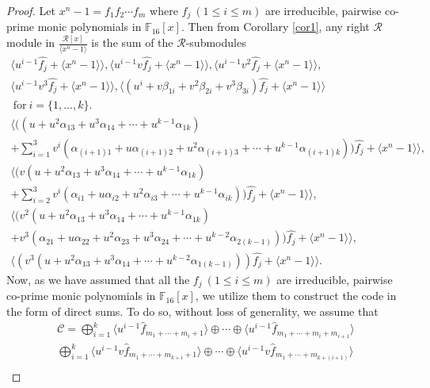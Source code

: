 \documentclass{amsart}
\theoremstyle{definition}
\theoremstyle{remark}
\numberwithin{equation}{section}
\begin{document}
 \begin{proof}
       Let $x^n-1=f_1f_2\cdots f_m$ where $f_j~(1\leq i\leq m)$ are irreducible, pairwise co-prime monic polynomials in $\mathbb F_{16}[x]$. Then from Corollary \ref{cor1}, any right $\mathcal{R}$ module in $\frac{\mathcal{R}[x]}{\langle x^n-1\rangle}$ is the sum of the $\mathcal{R}$-submodules \allowdisplaybreaks\begin{gather*}\langle u^{i-1}\hat{f_j} + \langle x^n-1\rangle \rangle ,
         \langle u^{i-1}v\hat{f_j} + \langle x^n-1\rangle \rangle ,  \langle u^{i-1}v^2\hat{f_j} + \langle x^n-1\rangle \rangle , \\  \langle u^{i-1}v^3\hat{f_j} + \langle x^n-1\rangle \rangle ,
        \langle (u^i+ v\beta_{1i} + v^2\beta_{2i} + v^3\beta_{3i})\hat{f_j} + \langle x^n-1\rangle \rangle \\ ~\text{for}~ i = \{1,\dots,k\}.\\
        \langle ((u + u^2\alpha_{13} + u^3\alpha_{14} + \cdots + u^{k-1}\alpha_{1k}) \\+ \sum_{i=1}^{3} v^i( \alpha_{(i+1)1} + u\alpha_{(i+1)2} + u^2\alpha_{(i+1)3} + \cdots + u^{k-1}\alpha_{(i+1)k} ))\hat{f_j} + \langle x^n-1\rangle \rangle ,\\
        \langle (v(u + u^2\alpha_{13} + u^3\alpha_{14} + \cdots + u^{k-1}\alpha_{1k}) \\ +\sum_{i=2}^{3} v^i( \alpha_{i1} + u\alpha_{i2} + u^2\alpha_{i3}  + \cdots + u^{k-1}\alpha_{ik} ))\hat{f_j} + \langle x^n-1\rangle \rangle, \\  \langle (v^2(u + u^2\alpha_{13} + u^3\alpha_{14} + \cdots + u^{k-1}\alpha_{1k}) \\+ v^3( \alpha_{21} + u\alpha_{22} + u^2\alpha_{23} + u^3\alpha_{24} + \cdots + u^{k-2}\alpha_{2(k-1)}))\hat{f_j} + \langle x^n-1\rangle \rangle, \\ \langle (v^3(u + u^2\alpha_{13} + u^3\alpha_{14} + \cdots + u^{k-2}\alpha_{1(k-1)}))\hat{f_j} + \langle x^n-1\rangle \rangle.\end{gather*}
{Now, as we have assumed that all the $f_j~(1\leq i\leq m)$ are irreducible, pairwise co-prime monic polynomials in $\mathbb F_{16}[x]$, we utilize them to construct the code in the form of direct sums. To do so, without loss of generality, we assume that}
    \allowdisplaybreaks
      \begin{gather*}
		\mathcal{C}= \bigoplus_{i=1}^{k}\langle u^{i-1}\hat{f}_{m_1+ \cdots+m_i+1}\rangle \oplus\cdots\oplus \langle u^{i-1}\hat{f}_{m_1+\cdots+m_i+m_{i+1}}\rangle
  \\ \bigoplus_{i=1}^{k}\langle u^{i-1}v\hat{f}_{m_1+\cdots +m_{k+i}+1}\rangle \oplus\cdots\oplus \langle u^{i-1}v\hat{f}_{m_1+\cdots +m_{k+(i+1)}}\rangle\\

\end{gather*}
\end{proof}
\end{document}
